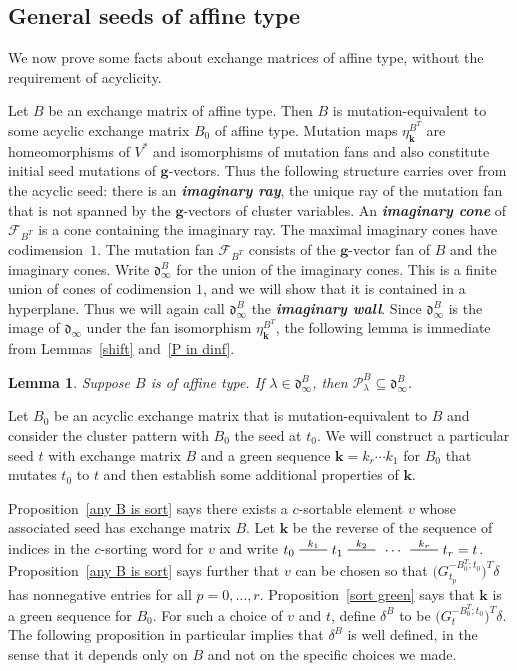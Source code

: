 \documentclass{amsart}
\newtheorem{lemma}[proposition]{Lemma}
\theoremstyle{definition}
\theoremstyle{remark}
\numberwithin{equation}{section}
\newcommand{\newword}[1]{\textbf{\emph{#1}}}
\newcommand{\edge}{\,\,\rule[2.7pt]{20pt}{0.5pt}\,\,}
\newcommand{\F}{{\mathcal F}}
\newcommand{\0}{{\mathbf{0}}}
\newcommand{\g}{\mathbf{g}}
\newcommand{\kk}{{\boldsymbol{k}}}
\renewcommand{\P}{\mathcal{P}}
\renewcommand{\d}{{\mathfrak d}}
\begin{document}
\subsection{General seeds of affine type}
We now prove some facts about exchange matrices of affine type, without the requirement of acyclicity.

Let $B$ be an exchange matrix of affine type.
Then $B$ is mutation-equivalent to some acyclic exchange matrix $B_0$ of affine type.
Mutation maps $\eta_\kk^{B^T}$ are homeomorphisms of $V^*$ and isomorphisms of mutation fans and also constitute initial seed mutations of $\g$-vectors.
Thus the following structure carries over from the acyclic seed:
there is an \newword{imaginary ray}, the unique ray of the mutation fan that is not spanned by the $\g$-vectors of cluster variables.
An \newword{imaginary cone} of $\F_{B^T}$ is a cone containing the imaginary ray.
The maximal imaginary cones have codimension~$1$.
The mutation fan $\F_{B^T}$ consists of the $\g$-vector fan of $B$ and the imaginary cones.
Write $\d^B_\infty$ for the union of the imaginary cones.
This is a finite union of cones of codimension $1$, and we will show that it is contained in a hyperplane.
Thus we will again call $\d^B_\infty$ the \newword{imaginary wall}.
Since $\d^B_\infty$ is the image of $\d_\infty$ under the fan isomorphism $\eta_\kk^{B^T}$, the following lemma is immediate from Lemmas~\ref{shift} and~\ref{P in dinf}.

\begin{lemma}\label{P in dBinf}
Suppose $B$ is of affine type.
If $\lambda\in\d^B_\infty$, then $\P^B_\lambda\subseteq\d^B_\infty$.
\end{lemma}

Let $B_0$ be an acyclic exchange matrix that is mutation-equivalent to $B$ and consider the cluster pattern with $B_0$ the seed at $t_0$.
We will construct a particular seed $t$ with exchange matrix $B$ and a green sequence $\kk=k_r\cdots k_1$ for $B_0$ that mutates $t_0$ to $t$ and then establish some additional properties of $\kk$.

Proposition~\ref{any B is sort} says there exists a $c$-sortable element $v$ whose associated seed has exchange matrix $B$.
Let $\kk$ be the reverse of the sequence of indices in the $c$-sorting word for $v$ and write $t_0\overset{k_1}{\edge}t_1\overset{k_2}{\edge}\,\cdots\,\overset{k_r}{\edge}t_r=t$.
Proposition~\ref{any B is sort} says further that $v$ can be chosen so that $\bigl(G_{t_p}^{-B_0^T;t_0}\bigr)^T\delta$ has nonnegative entries for all $p=0,\ldots,r$.
Proposition~\ref{sort green} says that $\kk$ is a green sequence for $B_0$.
For such a choice of $v$ and $t$, define $\delta^B$ to be $\bigl(G_t^{-B_0^T;t_0}\bigr)^T\delta$.  The following proposition in particular implies that $\delta^B$ is well defined, in the sense that it depends only on $B$ and not on the specific choices we made.
\end{document}
